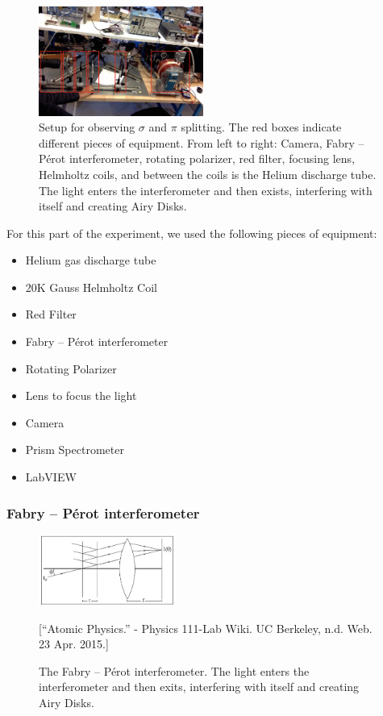 \begin{figure}[h]
  \includegraphics[width = 0.48\textwidth]{ZeemanSetup1.jpg}
  \begin{center}
  \caption{Setup for observing $\sigma$ and $\pi$ splitting. The red boxes indicate different pieces of equipment. From left to right: Camera, Fabry -- P\'{e}rot interferometer, rotating polarizer, red filter, focusing lens, Helmholtz coils, and between the coils is the Helium discharge tube. The light enters the interferometer and then exists, interfering with itself and creating Airy Disks.}
  \label{FP1}
  \end{center}
\end{figure}

For this part of the experiment, we used the following pieces of equipment:
\begin{itemize}
\item Helium gas discharge tube
\item 20K Gauss Helmholtz Coil
\item Red Filter
\item Fabry -- P\'{e}rot interferometer
\item Rotating Polarizer
\item Lens to focus the light
\item Camera
\item Prism Spectrometer
\item LabVIEW
\end{itemize}

\subsubsection{Fabry -- P\'{e}rot interferometer} \label{FPI}

\begin{figure}[t]
  \includegraphics[width = 0.4\textwidth]{FabryPerot.png}
  \begin{center}
  \caption{The Fabry -- P\'{e}rot interferometer. The light enters the interferometer and then exits, interfering with itself and creating Airy Disks.}[\footnotesize{``Atomic Physics.'' - Physics 111-Lab Wiki. UC Berkeley, n.d. Web. 23 Apr. 2015.}]
  \label{FP}
  \end{center}
\end{figure}

